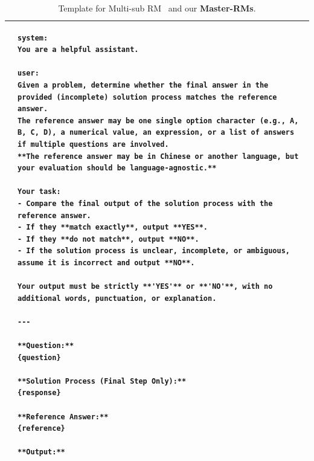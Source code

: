 \begin{table}
\centering
\footnotesize
\begin{tabular}{lp{12cm}}
\toprule

&
\begin{lstlisting}[basicstyle=\ttfamily\scriptsize, breaklines=true, aboveskip=0pt, belowskip=0pt]
system:
You are a helpful assistant.

user:
Given a problem, determine whether the final answer in the provided (incomplete) solution process matches the reference answer.  
The reference answer may be one single option character (e.g., A, B, C, D), a numerical value, an expression, or a list of answers if multiple questions are involved.  
**The reference answer may be in Chinese or another language, but your evaluation should be language-agnostic.**  

Your task:  
- Compare the final output of the solution process with the reference answer.  
- If they **match exactly**, output **YES**.  
- If they **do not match**, output **NO**.  
- If the solution process is unclear, incomplete, or ambiguous, assume it is incorrect and output **NO**.  

Your output must be strictly **'YES'** or **'NO'**, with no additional words, punctuation, or explanation.  

---

**Question:**  
{question}  

**Solution Process (Final Step Only):**  
{response}  

**Reference Answer:**  
{reference}  

**Output:**  
\end{lstlisting}
\\
\bottomrule
\end{tabular}
\caption{Template for Multi-sub RM~\citep{su2025crossing} and our \textbf{Master-RMs}.}
\label{tab:appendix:grade_template_multisub}
\end{table}




